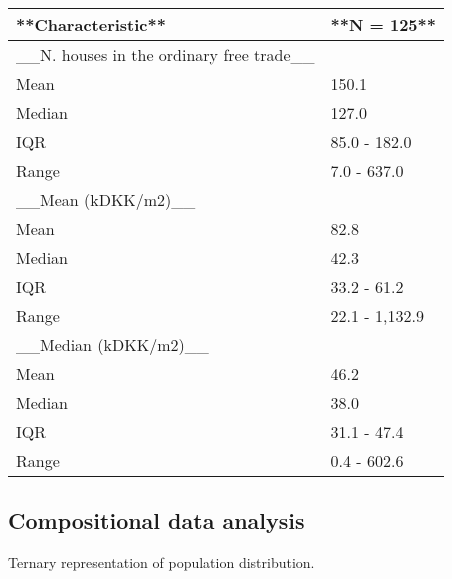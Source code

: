 \documentclass[
  12pt,
]{article}
\begin{document}
\begin{tabular}{l|l}
\hline
**Characteristic** & **N = 125**\\
\hline
\_\_N. houses in the ordinary free trade\_\_ & \\
\hline
Mean & 150.1\\
\hline
Median & 127.0\\
\hline
IQR & 85.0 - 182.0\\
\hline
Range & 7.0 - 637.0\\
\hline
\_\_Mean (kDKK/m2)\_\_ & \\
\hline
Mean & 82.8\\
\hline
Median & 42.3\\
\hline
IQR & 33.2 - 61.2\\
\hline
Range & 22.1 - 1,132.9\\
\hline
\_\_Median (kDKK/m2)\_\_ & \\
\hline
Mean & 46.2\\
\hline
Median & 38.0\\
\hline
IQR & 31.1 - 47.4\\
\hline
Range & 0.4 - 602.6\\
\hline
\end{tabular}

\hypertarget{compositional-data-analysis}{%
\subsection{Compositional data
analysis}\label{compositional-data-analysis}}

Ternary representation of population distribution.
\end{document}
